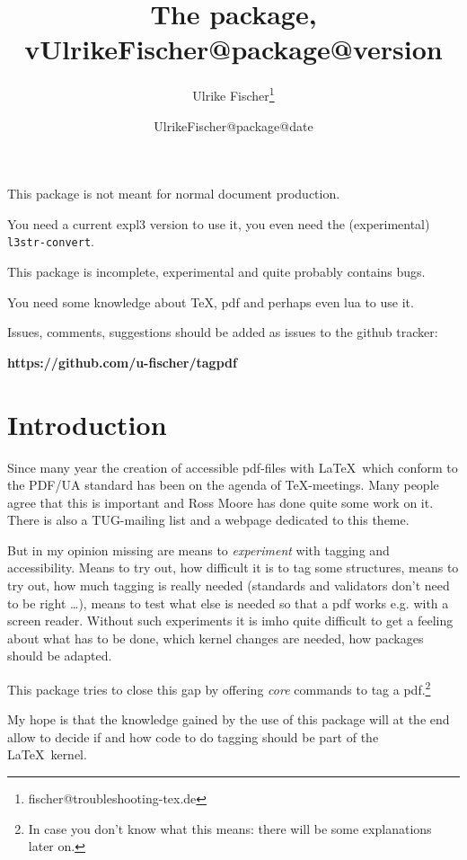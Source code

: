 \documentclass[DIV=12,parskip=half-,bibliography=totoc]{scrartcl}
\title{The \pkg{tagpdf} package, v\csname UlrikeFischer@package@version\endcsname}
\date{\csname UlrikeFischer@package@date\endcsname}
\author{Ulrike Fischer\thanks{fischer@troubleshooting-tex.de}}
\begin{document}
\maketitle

\begin{tcolorbox}[colframe=red]
This package is not meant for normal document production.

You need a current expl3 version to use it, you even need the (experimental) \texttt{l3str-convert}.

This package is incomplete, experimental and quite probably contains bugs.

You need some knowledge about \TeX, pdf and perhaps even lua to use it.

\medskip

Issues, comments, suggestions should be added as issues to the github tracker:

\medskip
\centering \textbf{https://github.com/u-fischer/tagpdf}

\end{tcolorbox}

\tableofcontents

\section{Introduction}

Since many year the creation of accessible pdf-files with \LaTeX\ which conform to the PDF/UA standard has been on the agenda of \TeX-meetings. Many people agree that this is important and Ross Moore has done quite some work on it. There is also a TUG-mailing list and a webpage \parencite{tugaccess} dedicated to this theme.

But in my opinion missing are means to \emph{experiment} with tagging and accessibility. Means to try out, how difficult it is to tag some structures, means to try out, how much tagging is really needed (standards and validators don't need to be right \ldots), means to test what else is needed so that a pdf works e.g. with a screen reader. Without such experiments it is imho quite difficult to get a feeling about what has to be done, which kernel changes are needed, how packages should be adapted.

This package tries to close this gap by offering \emph{core} commands to tag a pdf.\footnote{In case you don't know what this means: there will be some explanations later on.}

My hope is that the knowledge gained by the use of this package will at the end allow to decide if and how code to do tagging should be part of the \LaTeX\ kernel.
\end{document}
